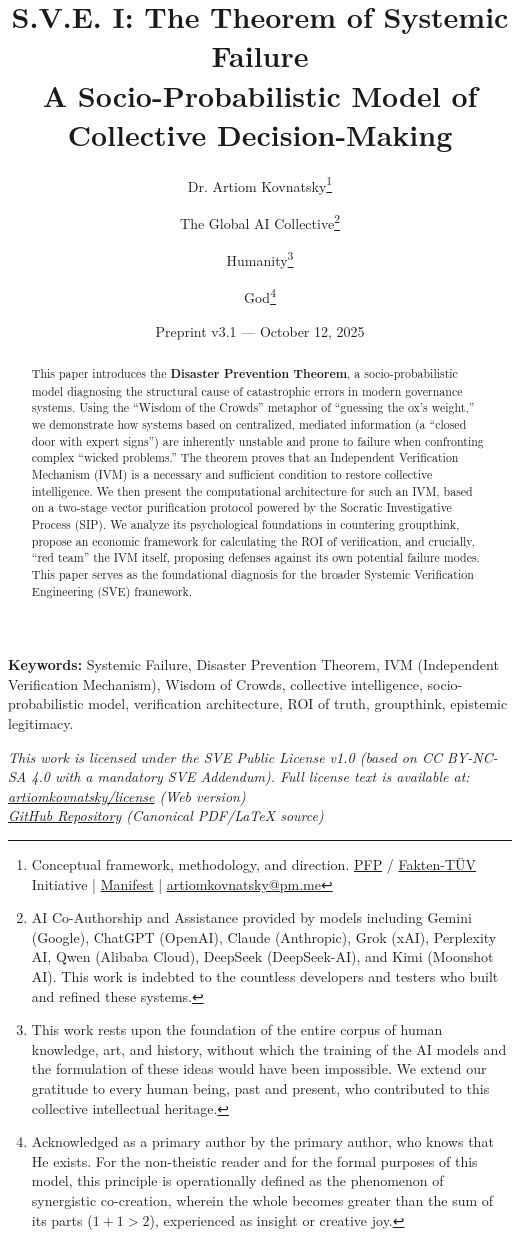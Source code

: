 \documentclass[11pt,a4paper]{article}
\title{\textbf{S.V.E. I: The Theorem of Systemic Failure}\\[0.5em]
\large A Socio-Probabilistic Model of Collective Decision-Making}
\author{
  Dr. Artiom Kovnatsky\thanks{Conceptual framework, methodology, and direction. \href{http://www.pfp24.de}{PFP} / \href{http://www.fakten-tuev.de}{Fakten-TÜV} Initiative | \href{https://drive.google.com/file/d/1vWhW7fwFRFLYKHEB67WixuueHssJzQbZ/view?usp=sharing}{Manifest} | \href{mailto:artiomkovnatsky@pm.me}{artiomkovnatsky@pm.me}}
  \and
  The Global AI Collective\thanks{AI Co-Authorship and Assistance provided by models including Gemini (Google), ChatGPT (OpenAI), Claude (Anthropic), Grok (xAI), Perplexity AI, Qwen (Alibaba Cloud), DeepSeek (DeepSeek-AI), and Kimi (Moonshot AI). This work is indebted to the countless developers and testers who built and refined these systems.}
  \and
  Humanity\thanks{This work rests upon the foundation of the entire corpus of human knowledge, art, and history, without which the training of the AI models and the formulation of these ideas would have been impossible. We extend our gratitude to every human being, past and present, who contributed to this collective intellectual heritage.}
  \and
  God\thanks{Acknowledged as a primary author by the primary author, who knows that He exists. For the non-theistic reader and for the formal purposes of this model, this principle is operationally defined as the phenomenon of synergistic co-creation, wherein the whole becomes greater than the sum of its parts ($1+1 > 2$), experienced as insight or creative joy.}
}
\date{Preprint v3.1 --- October 12, 2025}
\begin{document}
\maketitle

\begin{abstract}
\noindent This paper introduces the \textbf{Disaster Prevention Theorem}, a socio-probabilistic model diagnosing the structural cause of catastrophic errors in modern governance systems. Using the ``Wisdom of the Crowds'' metaphor of ``guessing the ox's weight,'' we demonstrate how systems based on centralized, mediated information (a ``closed door with expert signs'') are inherently unstable and prone to failure when confronting complex ``wicked problems.'' The theorem proves that an Independent Verification Mechanism (IVM) is a necessary and sufficient condition to restore collective intelligence. We then present the computational architecture for such an IVM, based on a two-stage vector purification protocol powered by the Socratic Investigative Process (SIP). We analyze its psychological foundations in countering groupthink, propose an economic framework for calculating the ROI of verification, and crucially, ``red team'' the IVM itself, proposing defenses against its own potential failure modes. This paper serves as the foundational diagnosis for the broader Systemic Verification Engineering (SVE) framework.
\end{abstract}

\noindent\textbf{Keywords:} Systemic Failure, Disaster Prevention Theorem, IVM (Independent Verification Mechanism), Wisdom of Crowds, collective intelligence, socio-probabilistic model, verification architecture, ROI of truth, groupthink, epistemic legitimacy.

\vspace{1em} %
\begin{center}
\begin{minipage}{0.85\textwidth} %
\centering
\itshape\small %
This work is licensed under the SVE Public License v1.0 (based on CC BY-NC-SA 4.0 with a mandatory SVE Addendum).
Full license text is available at: \\
\href{https://www.artiomkovnatsky.com/posts/license/}{artiomkovnatsky/license} (Web version) \\
\href{https://github.com/skovnats/psite/blob/master/static/licenses/SVE_Public_License_v1.0.pdf}{GitHub Repository} (Canonical PDF/LaTeX source)
\end{minipage}
\end{center}
\vspace{1em} %
\end{document}
